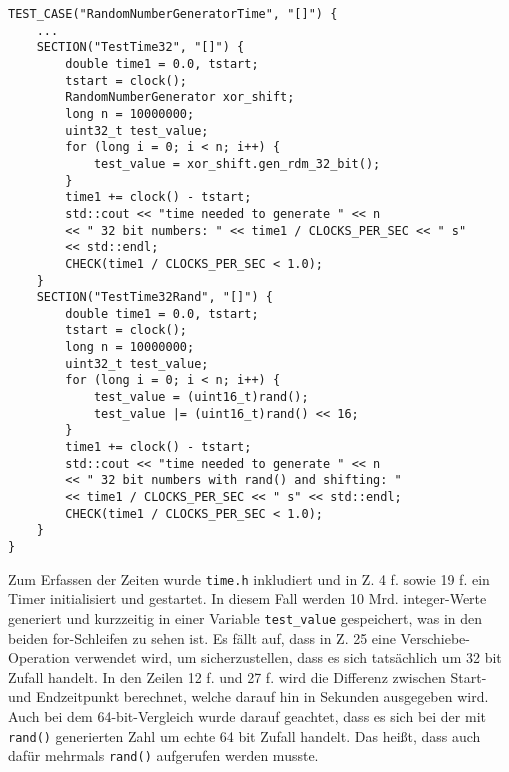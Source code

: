 \documentclass[../review_3.tex]{subfiles}
\begin{document}
\begin{lstlisting}[caption= {Test zum Vergleich der Zeiten vom RandomNumberGenerator mit rand()}, label = rngtime]
TEST_CASE("RandomNumberGeneratorTime", "[]") {
    ...
    SECTION("TestTime32", "[]") {
        double time1 = 0.0, tstart;
        tstart = clock();
        RandomNumberGenerator xor_shift;
        long n = 10000000;
        uint32_t test_value;
        for (long i = 0; i < n; i++) {
            test_value = xor_shift.gen_rdm_32_bit();
        }
        time1 += clock() - tstart;
        std::cout << "time needed to generate " << n
        << " 32 bit numbers: " << time1 / CLOCKS_PER_SEC << " s"
        << std::endl;
        CHECK(time1 / CLOCKS_PER_SEC < 1.0);
    }
    SECTION("TestTime32Rand", "[]") {
        double time1 = 0.0, tstart;
        tstart = clock();
        long n = 10000000;
        uint32_t test_value;
        for (long i = 0; i < n; i++) {
            test_value = (uint16_t)rand();
            test_value |= (uint16_t)rand() << 16;
        }
        time1 += clock() - tstart;
        std::cout << "time needed to generate " << n
        << " 32 bit numbers with rand() and shifting: "
        << time1 / CLOCKS_PER_SEC << " s" << std::endl;
        CHECK(time1 / CLOCKS_PER_SEC < 1.0);
    }
}\end{lstlisting}

Zum Erfassen der Zeiten wurde \texttt{time.h} inkludiert und in Z. 4 f. sowie 19 f. ein Timer initialisiert und gestartet. In diesem Fall werden 10 Mrd. integer-Werte generiert und kurzzeitig in einer Variable \texttt{test\_value} gespeichert, was in den beiden for-Schleifen zu sehen ist. Es fällt auf, dass in Z. 25 eine Verschiebe-Operation verwendet wird, um sicherzustellen, dass es sich tatsächlich um 32 bit Zufall handelt. In den Zeilen 12 f. und 27 f. wird die Differenz zwischen Start- und Endzeitpunkt berechnet, welche darauf hin in Sekunden ausgegeben wird. Auch bei dem 64-bit-Vergleich wurde darauf geachtet, dass es sich bei der mit \texttt{rand()} generierten Zahl um echte 64 bit Zufall handelt. Das heißt, dass auch dafür mehrmals \texttt{rand()} aufgerufen werden musste.
\end{document}
